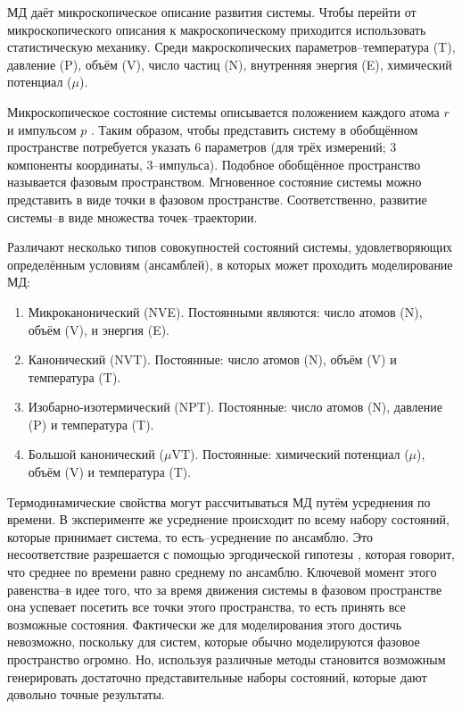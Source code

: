 МД даёт микроскопическое описание развития системы. Чтобы перейти от микроскопического описания к макроскопическому приходится использовать статистическую механику. Среди макроскопических параметров--температура (T), давление (P), объём (V), число частиц (N), внутренняя энергия (E), химический потенциал ($\mu$).

Микроскопическое состояние системы описывается положением каждого атома $r$ и импульсом $p$ \cite{Gibbs1946}. Таким образом, чтобы представить систему в обобщённом пространстве потребуется указать 6 параметров (для трёх измерений; 3 компоненты координаты, 3--импульса). Подобное обобщённое пространство называется фазовым пространством. Мгновенное состояние системы можно представить в виде точки в фазовом пространстве. Соответственно, развитие системы--в виде множества точек--траектории.

Различают несколько типов совокупностей состояний системы, удовлетворяющих определённым условиям (ансамблей), в которых может проходить моделирование МД:

\begin{enumerate}
\item Микроканонический (NVE). Постоянными являются: число атомов (N), объём (V), и энергия (E).
\item Канонический (NVT). Постоянные: число атомов (N), объём (V) и температура (T).
\item Изобарно-изотермический (NPT). Постоянные: число атомов (N), давление (P) и температура (T).
\item Большой канонический ($\mu$VT). Постоянные: химический потенциал ($\mu$), объём (V) и температура (T).
\end{enumerate}

Термодинамические свойства могут рассчитываться МД путём усреднения по времени. В эксперименте же усреднение происходит по всему набору состояний, которые принимает система, то есть--усреднение по ансамблю. Это несоответствие разрешается с помощью эргодической гипотезы \cite{Ulenbek1965}, которая говорит, что среднее по времени равно среднему по ансамблю. Ключевой момент этого равенства--в идее того, что за время движения системы в фазовом пространстве она успевает посетить все точки этого пространства, то есть принять все возможные состояния. Фактически же для моделирования этого достичь невозможно, поскольку для систем, которые обычно моделируются фазовое пространство огромно. Но, используя различные методы становится возможным генерировать достаточно представительные наборы состояний, которые дают довольно точные результаты.

